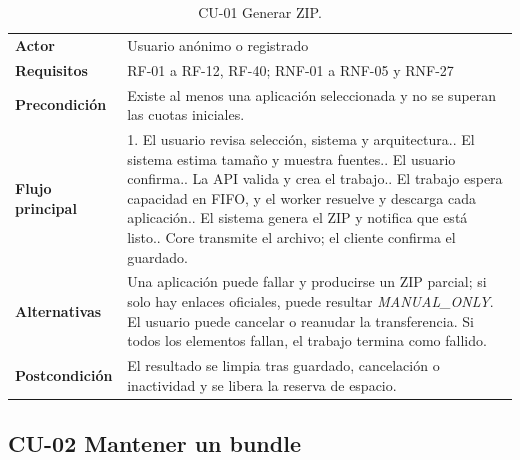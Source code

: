 \begin{table}[H]
\centering
\begin{tabularx}{\textwidth}{p{}X}
\toprule
\textbf{Actor} & Usuario anónimo o registrado\\
\textbf{Requisitos} & RF-01 a RF-12, RF-40; RNF-01 a RNF-05 y RNF-27\\
\textbf{Precondición} & Existe al menos una aplicación seleccionada y no se superan las cuotas iniciales.\\
\textbf{Flujo principal} & 1. El usuario revisa selección, sistema y arquitectura.\newline
2. El sistema estima tamaño y muestra fuentes.\newline
3. El usuario confirma.\newline
4. La API valida y crea el trabajo.\newline
5. El trabajo espera capacidad en FIFO, y el worker resuelve y descarga cada aplicación.\newline
6. El sistema genera el ZIP y notifica que está listo.\newline
7. Core transmite el archivo; el cliente confirma el guardado.\\
\textbf{Alternativas} & Una aplicación puede fallar y producirse un ZIP parcial; si solo hay enlaces oficiales, puede resultar \emph{MANUAL\_ONLY}. El usuario puede cancelar o reanudar la transferencia. Si todos los elementos fallan, el trabajo termina como fallido.\\
\textbf{Postcondición} & El resultado se limpia tras guardado, cancelación o inactividad y se libera la reserva de espacio.\\
\bottomrule
\end{tabularx}
\caption{CU-01 Generar ZIP.}
\label{tabla:cu-generar-zip}
\end{table}

\subsection{CU-02 Mantener un bundle}


